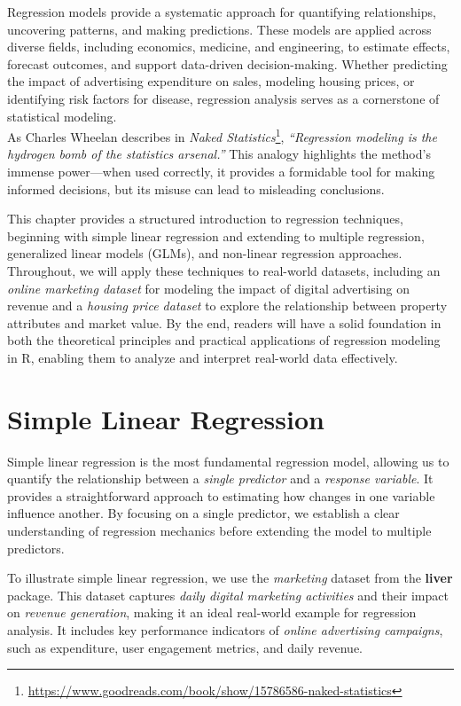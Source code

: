 \documentclass[
  11pt,
]{book}
\renewcommand{\href}[2]{#2\footnote{\url{#1}}}
\theoremstyle{definition}
\theoremstyle{definition}
\theoremstyle{definition}
\theoremstyle{definition}
\theoremstyle{remark}
\begin{document}
Regression models provide a systematic approach for quantifying relationships, uncovering patterns, and making predictions. These models are applied across diverse fields, including economics, medicine, and engineering, to estimate effects, forecast outcomes, and support data-driven decision-making. Whether predicting the impact of advertising expenditure on sales, modeling housing prices, or identifying risk factors for disease, regression analysis serves as a cornerstone of statistical modeling.\\
As Charles Wheelan describes in \href{https://www.goodreads.com/book/show/15786586-naked-statistics}{\emph{Naked Statistics}}\citep{wheelan2013naked}, \emph{``Regression modeling is the hydrogen bomb of the statistics arsenal.''} This analogy highlights the method's immense power---when used correctly, it provides a formidable tool for making informed decisions, but its misuse can lead to misleading conclusions.

This chapter provides a structured introduction to regression techniques, beginning with simple linear regression and extending to multiple regression, generalized linear models (GLMs), and non-linear regression approaches. Throughout, we will apply these techniques to real-world datasets, including an \emph{online marketing dataset} for modeling the impact of digital advertising on revenue and a \emph{housing price dataset} to explore the relationship between property attributes and market value. By the end, readers will have a solid foundation in both the theoretical principles and practical applications of regression modeling in R, enabling them to analyze and interpret real-world data effectively.

\section{Simple Linear Regression}\label{sec-simple-regression}

Simple linear regression is the most fundamental regression model, allowing us to quantify the relationship between a \emph{single predictor} and a \emph{response variable}. It provides a straightforward approach to estimating how changes in one variable influence another. By focusing on a single predictor, we establish a clear understanding of regression mechanics before extending the model to multiple predictors.

To illustrate simple linear regression, we use the \emph{marketing} dataset from the \textbf{liver} package. This dataset captures \emph{daily digital marketing activities} and their impact on \emph{revenue generation}, making it an ideal real-world example for regression analysis. It includes key performance indicators of \emph{online advertising campaigns}, such as expenditure, user engagement metrics, and daily revenue.
\end{document}
